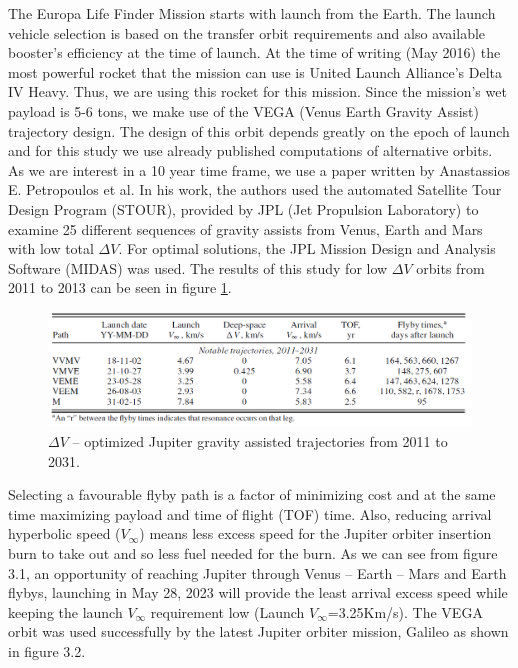 The Europa Life Finder Mission starts with launch from the Earth. The launch vehicle selection is based on the transfer orbit requirements and also available booster’s efficiency at the time of launch. At the time of writing (May 2016) the most powerful rocket that the mission can use is United Launch Alliance’s Delta IV Heavy. Thus, we are using this rocket for this mission. Since the mission’s wet payload is 5-6 tons, we make use of the VEGA (Venus Earth Gravity Assist) trajectory design. The design of this orbit depends greatly on the epoch of launch and for this study we use already published computations of alternative orbits. As we are interest in a 10 year time frame, we use a paper written by Anastassios E. Petropoulos et al\cite{petropoulos2000a}. In his work, the authors used the automated Satellite Tour Design Program (STOUR), provided by JPL (Jet Propulsion Laboratory) to examine 25 different sequences of gravity assists from Venus, Earth and Mars with low total $\Delta V$. For optimal solutions, the JPL Mission Design and Analysis Software (MIDAS) was used. The results of this study for low $\Delta V$ orbits from 2011 to 2013 can be seen in figure \ref{fig:grav_ass_traj}.

\begin{figure}[htb!]
\centering
\includegraphics[width=1\textwidth]{figures/Orbiter/traj.png}
\caption{$\Delta V$ – optimized Jupiter gravity assisted trajectories from 2011 to 2031. \cite{petropoulos2000a}}\label{fig:grav_ass_traj}
\end{figure}

Selecting a favourable flyby path is a factor of minimizing cost and at the same time maximizing payload and time of flight (TOF) time. Also, reducing arrival hyperbolic speed ($V_{\infty}$) means less excess speed for the Jupiter orbiter insertion burn to take out and so less fuel needed for the burn. As we can see from figure 3.1, an opportunity of reaching Jupiter through Venus – Earth – Mars and Earth flybys, launching in May 28, 2023 will provide the least arrival excess speed while keeping the launch $V_{\infty}$ requirement low (Launch $V_{\infty}$=3.25Km/s). The VEGA orbit was used successfully by the latest Jupiter orbiter mission, Galileo as shown in figure 3.2.

